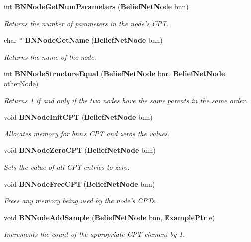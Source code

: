 \begin{CompactItemize}
int {\bf BNNode\-Get\-Num\-Parameters} ({\bf Belief\-Net\-Node} bnn)
\begin{CompactList}\small\item\em Returns the number of parameters in the node's CPT. \item\end{CompactList}\item 
char $\ast$ {\bf BNNode\-Get\-Name} ({\bf Belief\-Net\-Node} bnn)
\begin{CompactList}\small\item\em Returns the name of the node. \item\end{CompactList}\item 
int {\bf BNNode\-Structure\-Equal} ({\bf Belief\-Net\-Node} bnn, {\bf Belief\-Net\-Node} other\-Node)
\begin{CompactList}\small\item\em Returns 1 if and only if the two nodes have the same parents in the same order. \item\end{CompactList}\item 
void {\bf BNNode\-Init\-CPT} ({\bf Belief\-Net\-Node} bnn)
\begin{CompactList}\small\item\em Allocates memory for bnn's CPT and zeros the values. \item\end{CompactList}\item 
void {\bf BNNode\-Zero\-CPT} ({\bf Belief\-Net\-Node} bnn)
\begin{CompactList}\small\item\em Sets the value of all CPT entries to zero. \item\end{CompactList}\item 
void {\bf BNNode\-Free\-CPT} ({\bf Belief\-Net\-Node} bnn)
\begin{CompactList}\small\item\em Frees any memory being used by the node's CPTs. \item\end{CompactList}\item 
void {\bf BNNode\-Add\-Sample} ({\bf Belief\-Net\-Node} bnn, {\bf Example\-Ptr} e)
\begin{CompactList}\small\item\em Increments the count of the appropriate CPT element by 1. \item\end{CompactList}\item 

\end{CompactItemize}
